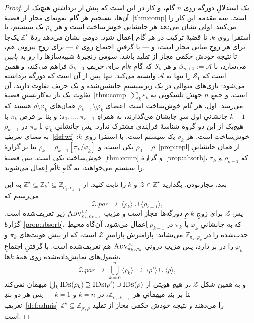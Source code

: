 \documentclass[10pt,oneside,openany]{book}
\newcommand{\pars}{\mathit{par}}
\newcommand{\Zenv}{\mathcal{Z}}
\newcommand{\Adv}{\mathcal{A}}
\newcommand{\Sim}{\mathcal{S}}
\newcommand{\advtg}{\op{Adv}}
\newcommand{\ZenvSet}{\mathbb{Z}}
\newcommand{\op}[1]{\textnormal{\textsc{#1}}}
\newcommand{\IDs}{\op{IDs}}
\newcommand{\ncl}[1]{\langle #1 \rangle}
\theoremstyle{accentdef}
\theoremstyle{accentplain}
\begin{document}
\begin{proof}
یک استدلالِ دورگه روی $n$ گام، و کار در این است که پیش از برداشتنِ هیچ‌یک
از آن‌ها، بسنجیم هر گام نمونه‌ای مجاز از قضیهٔ~\ref{thm:comp} است. سه
مقدمه این کار را می‌کنند. اولی نشان می‌دهد هر جانشانی خوش‌ساخت است و هر
$\rho_k$ یک سیستم، با استقرا روی $k$، تا قضیهٔ ترکیب در هر گام اِعمال شود.
دومی نشان می‌دهد ردهٔ $\ZenvSet^{\star}$ یک‌جا برای هر زوجِ میانی مجاز است،
و --- با گرفتنِ اجتماع روی $k$ --- برای زوجِ بیرونی هم، تا نتیجه خودش حکمی
مجاز از تقلید باشد. سومی زنجیرهٔ شبیه‌سازها را \emph{رو به پایین} می‌سازد،
با $\Sim_{n+1} := \Adv$ و هر $\Sim_k$ که گامِ $k$اُم برای حریفِ
$\Sim_{k+1}$ فراهم می‌کند، و همین است که $\Sim_1$ را تنها به $\Adv$ وابسته
می‌کند. تنها پس از آن است که دورگه برداشته می‌شود: بازی‌های متوالی در یک
زیرسیستمِ جانشین‌شده و یک حریف تفاوت دارند، آن تفاوت یک بار به‌کاربستنِ
قضیهٔ~\ref{thm:comp} است، و جمعِ $n$ جهش تلسکوپی به $\sum_k \varepsilon_k$
می‌رسد.
اول، هر گام خوش‌ساخت است. اعضای $\rho_{k-1} \setminus \varphi_k$ همان‌های
$\rho \setminus \varphi_k$ هستند که $k-1$ جانشانیِ اول سرِ جایشان
می‌گذارند، به همراهِ $\pi_1,\dots,\pi_{k-1}$؛ و بنا بر فرض $\pi_k$ با
هیچ‌یک از این دو گروه شناسهٔ فرایندی مشترک ندارد. پس جانشانیِ $\varphi_k$
با $\pi_k$ در $\rho_{k-1}$ به معنای تعریفِ~\ref{def:wf} خوش‌ساخت است. هر
$\rho_k$ یک سیستم است، با استقرا روی $k$: $\rho_0 = \rho$ یکی است، و
$\rho_k = \rho_{k-1}[\pi_k/\varphi_k]$ بنا بر گزارهٔ~\ref{prop:repl} از
همان جانشانیِ خوش‌ساخت یکی است. پس قضیهٔ~\ref{thm:comp} و
گزارهٔ~\ref{prop:absorb}، که $\rho_{k-1}$ و $\pi_k$ را سیستم می‌خواهند، به
گامِ $k$اُم اِعمال می‌شوند.

بعد، مجازبودن. بگذارید $\Zenv \in \ZenvSet^{\star}$ و $k$ را ثابت کنید. از
$\ZenvSet^{\star} \subseteq \ZenvSet_k' \subseteq
\ZenvSet_{\rho_k,\rho_{k-1}}$ به این می‌رسیم که
\[
  \Zenv.\pars \;\supseteq\; \ncl{\rho_k} \cup \ncl{\rho_{k-1}} ,
\]
پس $\Zenv$ برای زوجِ $k$اُمِ دورگه‌ها مجاز است و مزیتِ
$\advtg^{\op{uc}}_{\rho_k,\rho_{k-1}}$ِ زیر تعریف‌شده است.
گزارهٔ~\ref{prop:absorb}، که به جانشانیِ $\varphi_k$ با $\pi_k$ در
$\rho_{k-1}$ اِعمال می‌شود، آن‌گاه محیطِ جذب‌شده را در
$\ZenvSet_{\pi_k,\varphi_k}$ می‌نشاند: پارامترش پارامترِ $\Zenv$ است، که از
پیش هویت‌های $\pi_k$ و $\varphi_k$ را در بر دارد، پس مزیتِ درونیِ
$\advtg^{\op{uc}}_{\pi_k,\varphi_k}$ هم تعریف‌شده است. با گرفتنِ اجتماعِ
شمول‌های نمایش‌داده‌شده روی همهٔ $k$ها،
\[
  \Zenv.\pars \;\supseteq\; \bigcup_{k=0}^{n} \ncl{\rho_k} \;\supseteq\; \ncl{\rho'} \cup \ncl{\rho} ,
\]
و به همین شکل $\Zenv$ در هیچ هویتی از $\bigcup_k \IDs(\rho_k) \supseteq
\IDs(\rho') \cup \IDs(\rho)$ میهمان نمی‌کند --- بنا بر بندِ میهمانیِ هر
$\ZenvSet_{\rho_k,\rho_{k-1}}$، در $k = n$ و $k = 1$ --- پس هر دو بندِ
تعریفِ~\ref{def:admis} $\ZenvSet^{\star} \subseteq \ZenvSet_{\rho',\rho}$
را می‌دهند و نتیجه خودش حکمی مجاز از تقلید است.


\end{proof}
\end{document}
